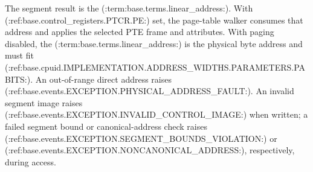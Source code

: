 The segment result is the (:term:base.terms.linear_address:). With (:ref:base.control_registers.PTCR.PE:) set, the page-table walker consumes that address and applies
the selected PTE frame and attributes. With paging disabled, the (:term:base.terms.linear_address:) is the physical byte address and
must fit (:ref:base.cpuid.IMPLEMENTATION.ADDRESS_WIDTHS.PARAMETERS.PABITS:). An out-of-range direct address raises
(:ref:base.events.EXCEPTION.PHYSICAL_ADDRESS_FAULT:). An invalid segment image raises (:ref:base.events.EXCEPTION.INVALID_CONTROL_IMAGE:) when written; a failed segment bound or
canonical-address check raises (:ref:base.events.EXCEPTION.SEGMENT_BOUNDS_VIOLATION:) or (:ref:base.events.EXCEPTION.NONCANONICAL_ADDRESS:), respectively, during access.
